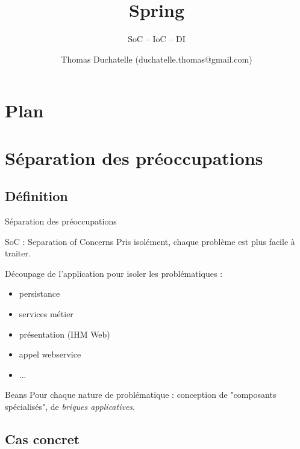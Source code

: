 \documentclass[compress]{beamer}%
\title{Spring}
\subtitle{SoC -- IoC -- DI}
\author{Thomas Duchatelle (duchatelle.thomas@gmail.com)}
\institute{Capgemini, pour Yves Rocher}
\begin{document}
\frame{\titlepage}
  
\section*{Plan}
\frame{\tableofcontents[hideallsubsections]}
	
\section{Séparation des préoccupations}

\subsection{Définition}

\begin{frame}{Séparation des préoccupations}
	
	\begin{block}{SoC : Separation of Concerns}
	Pris isolément, chaque problème est plus facile à traiter.
	\end{block}

	\pause
	Découpage de l'application pour isoler les problématiques :
	\begin{itemize}
	\item persistance
	\item services métier
	\item présentation (IHM Web)
	\item appel webservice
	\item ...
	\end{itemize}
	
	\pause
	\begin{block}{Beans}
	Pour chaque nature de problématique : conception de "composants spécialisés", de \emph{briques applicatives}.
	\end{block}
\end{frame}

\subsection{Cas concret}
\end{document}
